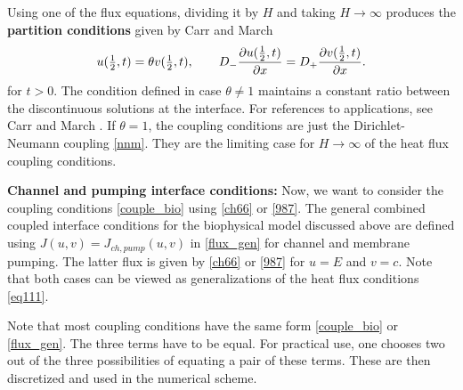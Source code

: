 Using one of the flux equations, dividing it by $H$ and taking $H \to \infty$ produces 
the {\bf partition conditions} given by Carr and March \cite{l116} 
% 
\begin{equation}
u({\textstyle\frac 12},t)=\theta v({\textstyle\frac 12},t),\qquad D_- \frac{\partial u(\frac 12,t)}{\partial x} 
=D_+ \frac{\partial  v(\frac 12,t)}{\partial x}.
\label{part1}
\end{equation}
%
for $t>0$. The condition defined in case $\theta\neq 1$ maintains a constant
ratio between the discontinuous solutions at the interface. For references to applications, see Carr and March \cite{l116}.
If $\theta =1$, the coupling conditions are just the Dirichlet-Neumann coupling \eqref{nnm}. They are the limiting case for $H\to\infty$ of the heat flux coupling conditions.

\noindent
{\bf Channel and pumping interface conditions:}
Now, we want to consider the coupling conditions \eqref{couple_bio} using
\eqref{ch66} or \eqref{987}.
The general combined coupled interface conditions for the biophysical model discussed above are defined 
using $J(u,v)=J_{ch,pump}(u,v)$ in \eqref{flux_gen} for channel and membrane pumping. The latter flux is given by \eqref{ch66} or \eqref{987} for $u=E$ and $v=c$. 
Note that both cases can be viewed as generalizations of the heat flux conditions \eqref{eq111}.



Note that most coupling conditions have the same form \eqref{couple_bio} or \eqref{flux_gen}. The three terms have to be equal. 
For practical use, one chooses two out of the three possibilities of equating a pair of these terms. These are then discretized and used
in the numerical scheme.